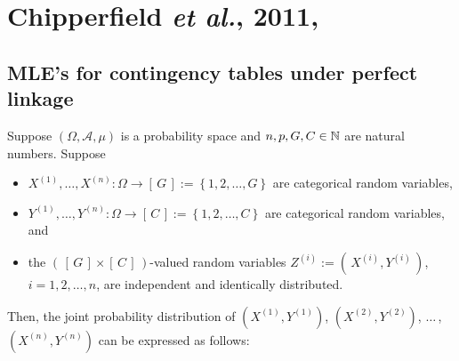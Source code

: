 

\section{Chipperfield \textit{et al.}, 2011, \cite{Chipperfield2011}}
\setcounter{theorem}{0}
\setcounter{equation}{0}

\renewcommand{\theenumi}{\roman{enumi}}
\renewcommand{\labelenumi}{\textnormal{(\theenumi)}$\;\;$}


\subsection{MLE's for contingency tables under perfect linkage}
Suppose
$\left(\Omega,\mathcal{A},\mu\right)$ is a probability space and
$n, p, G, C \in \mathbb{N}$ are natural numbers.
Suppose
\begin{itemize}
\item
	$X^{(1)}, \ldots, X^{(n)} : \Omega \longrightarrow \left[\,G\,\right] := \left\{1,2,\ldots,G\right\}$
	are categorical random variables,
\item
	$Y^{(1)}, \ldots, Y^{(n)} : \Omega \longrightarrow \left[\,C\,\right] := \left\{1,2,\ldots,C\right\}$
	are categorical random variables, and
\item
	the $\left(\,\left[\,G\,\right] \times \left[\,C\,\right]\,\right)$-valued random variables
	$Z^{(i)} := \left(\,X^{(i)},Y^{(i)}\,\right)$, $i = 1, 2, \ldots, n$, are independent and identically distributed.
\end{itemize}
Then, the joint probability distribution of
$\left(X^{(1)},Y^{(1)}\right)$, $\left(X^{(2)},Y^{(2)}\right)$, $\ldots$\,, $(X^{(n)},Y^{(n)})$
can be expressed as follows:
